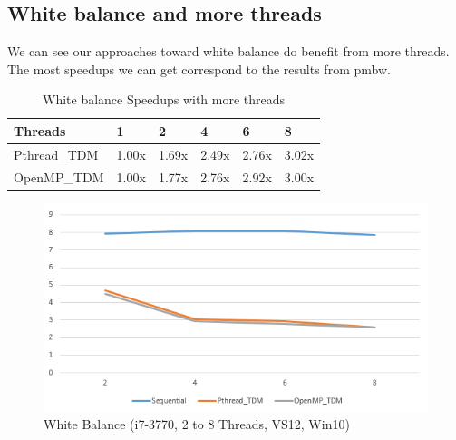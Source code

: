 \documentclass{acm_proc_article-sp}
\begin{document}
\subsection{White balance and more threads}
We can see our approaches toward white balance do benefit from more threads. \\
The most speedups we can get correspond to the results from pmbw.
\begin{table}[H]
\centering
\caption{White balance Speedups with more threads}
\begin{tabular}{|l|l|l|l|l|l|} \hline
Threads&1&2&4&6&8\\ \hline
Pthread\_TDM & 1.00x & 1.69x & 2.49x & 2.76x & 3.02x \\ \hline
OpenMP\_TDM & 1.00x & 1.77x & 2.76x & 2.92x & 3.00x \\ \hline
\end{tabular}
\end{table}
\begin{figure}[H]
  \includegraphics[width=\linewidth,natwidth=575,natheight=312]{white_morethreads.png}
  \caption{White Balance (i7-3770, 2 to 8 Threads, VS12, Win10)}
  \label{fig:white_morethreads}
\end{figure}
\end{document}
